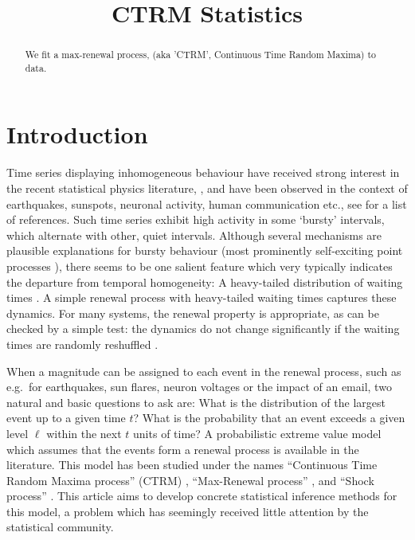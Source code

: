 \documentclass[12pt]{article}
\theoremstyle{definition}
\theoremstyle{remark}
\numberwithin{equation}{section}
\newcommand{\1}{\mathbf 1}
\begin{document}

\title{CTRM Statistics}
\maketitle
\begin{abstract}
We fit a max-renewal process, (aka 'CTRM', Continuous Time Random Maxima)
to data. 

\end{abstract}


\section{Introduction}

Time series displaying inhomogeneous behaviour have received strong interest in 
the recent statistical physics literature,
\cite{Barabasi2005,Oliveira2005,Vasquez2006,Vazquez2007,Omi2011,
Min2010,Karsai2011,Bagrow2013},
and have been observed in the context of earthquakes, sunspots, neuronal
activity, human communication etc., see \cite{Karsai2012,Vajna2013} for a 
list of references.
Such time series exhibit high activity in some `bursty' intervals, which 
alternate with other, quiet intervals.  Although several mechanisms are 
plausible explanations for bursty behaviour
(most prominently self-exciting point processes \cite{Hawkes1971}),
there seems to be one salient
feature which very typically indicates the departure from temporal homogeneity: 
A heavy-tailed distribution of waiting times
\cite{Vasquez2006,Karsai2012,Vajna2013}. 
A simple renewal process with heavy-tailed waiting times captures these
dynamics. For many systems, the renewal property is appropriate, as can be
checked by a simple test: the dynamics do not change significantly if the
waiting times are randomly reshuffled \cite{Karsai2012}.

When a magnitude can be assigned to each event in the renewal process, 
such as e.g.\
for earthquakes, sun flares, neuron voltages or the impact of an email,
two natural and basic questions to ask are: 
What is the distribution of the largest event up to a given time $t$?
What is the probability that an event exceeds a given level $\ell$ within the
next $t$ units of time?
A probabilistic extreme value model which assumes that the events form a 
renewal process is available in the literature. 
This model has been studied under the names
``Continuous Time Random Maxima process'' (CTRM) 
\cite{Benson2007,Meerschaert2009,Hees16,Hees2015}, 
``Max-Renewal process'' \cite{Silvestrov2002a,ST04,Basrak2014}, 
and ``Shock process'' 
\cite{Esary1973,Sumita1983,Sumita1984,Sumita1985,Anderson1987,Gut1999}.
This article aims to develop concrete statistical inference methods for this model, 
a problem which has seemingly received little attention by the statistical 
community. 
\end{document}
